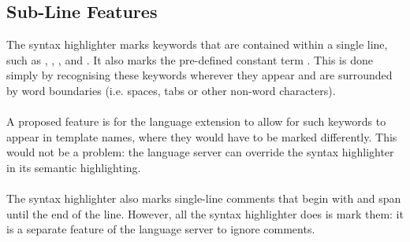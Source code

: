 \documentclass[../main.tex]{subfiles}
\begin{document}
\subsection{Sub-Line Features}
The syntax highlighter marks keywords that are contained within a single line, such as , , ,  and . It also marks the pre-defined constant term . This is done simply by recognising these keywords wherever they appear and are surrounded by word boundaries (i.e. spaces, tabs or other non-word characters). 
\\ 
\\ 
A proposed feature is for the language extension to allow for such keywords to appear in template names, where they would have to be marked differently. This would not be a problem: the language server can override the syntax highlighter in its semantic highlighting.
\\ 
\\ 
The syntax highlighter also marks single-line comments that begin with \codeword{\%} and span until the end of the line. However, all the syntax highlighter does is mark them: it is a separate feature of the language server to ignore comments.
\end{document}
